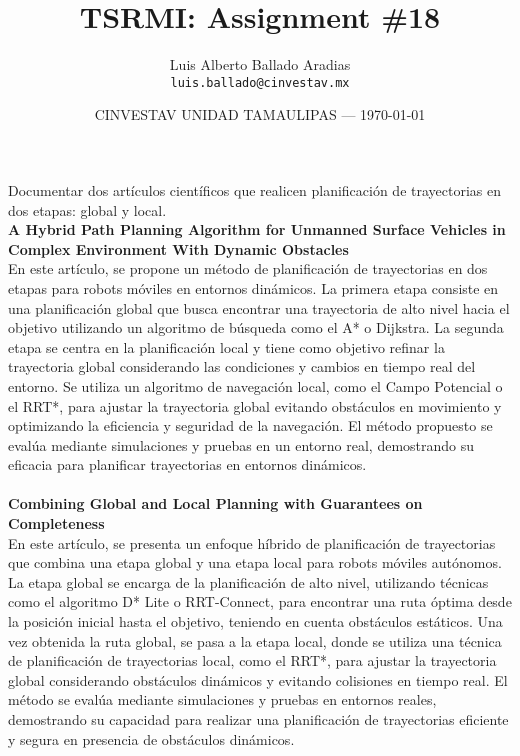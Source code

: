 \documentclass{article}
\title{TSRMI: Assignment \#18} %
\author{Luis Alberto Ballado Aradias\\ \texttt{luis.ballado@cinvestav.mx}} %
\date{CINVESTAV UNIDAD TAMAULIPAS --- \today} %
\begin{document}
\maketitle %


Documentar dos artículos científicos que realicen planificación de trayectorias en dos etapas: global y local.\\

\textbf{A Hybrid Path Planning Algorithm for Unmanned Surface Vehicles in Complex Environment With Dynamic Obstacles}\\

En este artículo, se propone un método de planificación de trayectorias en dos etapas para robots móviles en entornos dinámicos. La primera etapa consiste en una planificación global que busca encontrar una trayectoria de alto nivel hacia el objetivo utilizando un algoritmo de búsqueda como el A* o Dijkstra. La segunda etapa se centra en la planificación local y tiene como objetivo refinar la trayectoria global considerando las condiciones y cambios en tiempo real del entorno. Se utiliza un algoritmo de navegación local, como el Campo Potencial o el RRT*, para ajustar la trayectoria global evitando obstáculos en movimiento y optimizando la eficiencia y seguridad de la navegación. El método propuesto se evalúa mediante simulaciones y pruebas en un entorno real, demostrando su eficacia para planificar trayectorias en entornos dinámicos.\\\\

\textbf{Combining Global and Local Planning with Guarantees on Completeness}\\

En este artículo, se presenta un enfoque híbrido de planificación de trayectorias que combina una etapa global y una etapa local para robots móviles autónomos. La etapa global se encarga de la planificación de alto nivel, utilizando técnicas como el algoritmo D* Lite o RRT-Connect, para encontrar una ruta óptima desde la posición inicial hasta el objetivo, teniendo en cuenta obstáculos estáticos. Una vez obtenida la ruta global, se pasa a la etapa local, donde se utiliza una técnica de planificación de trayectorias local, como el RRT*, para ajustar la trayectoria global considerando obstáculos dinámicos y evitando colisiones en tiempo real. El método se evalúa mediante simulaciones y pruebas en entornos reales, demostrando su capacidad para realizar una planificación de trayectorias eficiente y segura en presencia de obstáculos dinámicos.\\
\end{document}
